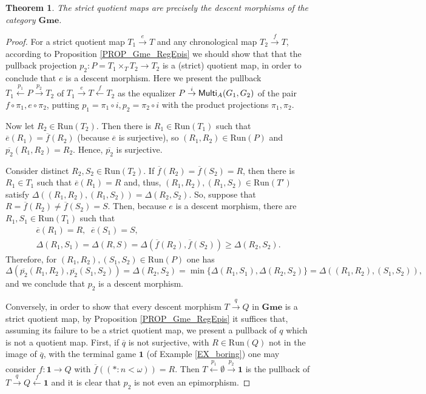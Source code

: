 \documentclass[12pt]{amsart}
\newtheorem{thm}{Theorem}[section]
\theoremstyle{definition}
\newcommand{\seq}[1]{{\left( {#1} \right)}}
\newcommand{\A}{\textup{\textmd{\textsc{A}}}}
\newcommand{\Run}{{\mathrm{Run}}}
\newcommand{\Gmes}{\mathbf{Gme}}
\newcommand{\Multi}{\mathsf{Multi}}
\begin{document}
\begin{thm}\label{THM_Proj_PullbackStable}
	The strict quotient maps are precisely the descent morphisms of the category $\Gmes$. 
\end{thm}
\begin{proof}
	For a strict quotient map $T_1\stackrel{e}{\to} T$ and any chronological map $T_2\stackrel{f}{\to} T$, according to Proposition \ref{PROP_Gme_RegEpis} we should show that that the pullback projection $p_2: P=T_1\times_T T_2\to T_2$ is a (strict) quotient map, in order to conclude that $e$ is a descent morphism. Here we present the pullback $T_1\stackrel{p_1}{\leftarrow}P \stackrel{p_2}{\to} T_2$  of $T_1\stackrel{e}{\to}T\stackrel{f}{\leftarrow}T_2$ as the equalizer $P \stackrel{i}{\to} \Multi_\A(G_1,G_2)$ of the pair $f\circ\pi_1, e\circ \pi_2$, putting $p_1=\pi_1\circ i, p_2=\pi_2\circ i$ with the product projections $\pi_1,\pi_2$.
	
	Now let $R_2\in \Run(T_2)$. Then there is $R_1\in \Run(T_1)$ such that $\overline{e}(R_1)=\overline{f}(R_2)$ (because $\overline{e}$ is surjective), so $(R_1,R_2)\in \Run(P)$ and $\overline{p_2}(R_1,R_2)=R_2$. Hence, $\overline{p_2}$ is surjective. 
	
	Consider distinct $R_2,S_2\in \Run(T_2)$. If $\overline{f}(R_2) = \overline{f}(S_2)=R$, then there is  $R_1\in T_1$ such that $\overline{e}(R_1)=R$ and, thus, $(R_1, R_2), (R_1,S_2)\in \Run(T')$ satisfy $\Delta((R_1,R_2),(R_1,S_2)) = \Delta(R_2,S_2)$. So, suppose that $R = \overline{f}(R_2) \neq \overline{f}(S_2) = S$. Then, because $e$ is a descent morphism, there are $R_1,S_1\in \Run(T_1)$ such that
	\begin{gather*}
		\overline{e}(R_1) = R,\;\;
		\overline{e}(S_1) = S,\\
		\Delta(R_1,S_1) = \Delta(R,S) = \Delta(\overline{f}(R_2), \overline{f}(S_2)) \ge \Delta(R_2,S_2).
	\end{gather*}
	Therefore, for $(R_1, R_2), (S_1,S_2)\in \Run(P)$ one has
	\[
	\Delta(\overline{p_2}(R_1,R_2), \overline{p_2}(S_1,S_2)) = \Delta(R_2,S_2)  = \min\{\Delta(R_1,S_1),\Delta(R_2,S_2)\} = \Delta((R_1,R_2),(S_1,S_2)),
	\]
	and we conclude that $p_2$ is a descent morphism.
	
	Conversely, in order to show that every descent morphism $T\stackrel{q}{\to}Q$ in $\Gmes$ is a  strict quotient map, by Proposition \ref{PROP_Gme_RegEpis} it suffices that, assuming its failure to be a strict quotient map, we present a pullback of $q$ which is not a quotient map. First, if $\overline{q}$ is not surjective, with $R\in \Run(Q)$ not in the image of $\overline{q}$, with the terminal game $\mathbf 1$ (of Example \ref{EX_boring}) one may consider $f\colon \mathbf{1}\to Q$ with $\overline{f}(\seq{\ast:n<\omega}) = R$. Then  $T\stackrel{p_1}{\leftarrow}\emptyset \stackrel{p_2}{\to} \mathbf{1}$ is the pullback of $T\stackrel{q}{\to}Q\stackrel{f}{\leftarrow}\mathbf{1}$ and it is clear that $p_2$ is not even an epimorphism.
	

\end{proof}
\end{document}
